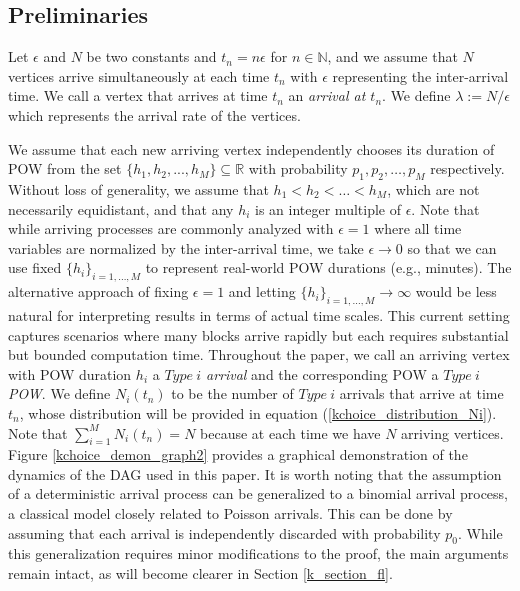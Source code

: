 \documentclass[12pt]{article}
\numberwithin{equation}{section}  %
\begin{document}
\subsection{Preliminaries}\label{sec_preliminaries}
Let $\epsilon$ and $N$ be two constants and $t_n=n\epsilon$ for $n\in\mathbb{N}$, and we assume that $N$ vertices arrive simultaneously at each time $t_n$ with $\epsilon$ representing the inter-arrival time. We call a vertex that arrives at time $t_n$ an \textit{arrival at $t_n$}. We define $\lambda:=N/\epsilon$ which represents the arrival rate of the vertices. 

We assume that each new arriving vertex independently chooses its duration of POW from the set $\{h_1,h_2,...,h_M\}\subseteq\mathbb{R}$ with probability $p_1,p_2,\ldots,p_M$ respectively. Without loss of generality, we assume that $h_1<h_2<\ldots<h_M$, which are not necessarily equidistant, and that any $h_i$ is an integer multiple of $\epsilon$. Note that while arriving processes are commonly analyzed with $\epsilon = 1$ where all time variables are normalized by the inter-arrival time, we take $\epsilon \rightarrow 0$ so that we can use fixed $\{h_i\}_{i=1,\ldots,M}$ to represent real-world POW durations (e.g., minutes). The alternative approach of fixing $\epsilon = 1$ and letting $\{h_i\}_{i=1,\ldots,M} \rightarrow \infty$ would be less natural for interpreting results in terms of actual time scales. This current setting captures scenarios where many blocks arrive rapidly but each requires substantial but bounded computation time. Throughout the paper, we call an arriving vertex with POW duration $h_i$ a \textit{$Type\ i$ arrival} and the corresponding POW a \textit{$Type\ i$ POW}. We define $N_i(t_n)$ to be the number of {$Type\ i$} arrivals that arrive at time $t_n$, whose distribution will be provided in equation (\ref{kchoice_distribution_Ni}). Note that $\sum_{i=1}^{M}N_i(t_n)=N$ because at each time we have $N$ arriving vertices. Figure \ref{kchoice_demon_graph2} provides a graphical demonstration of the dynamics of the DAG used in this paper. It is worth noting that the assumption of a deterministic arrival process can be generalized to a binomial arrival process, a classical model closely related to Poisson arrivals. This can be done by assuming that each arrival is independently discarded with probability $p_0$. While this generalization requires minor modifications to the proof, the main arguments remain intact, as will become clearer in Section \ref{k_section_fl}.
\end{document}
